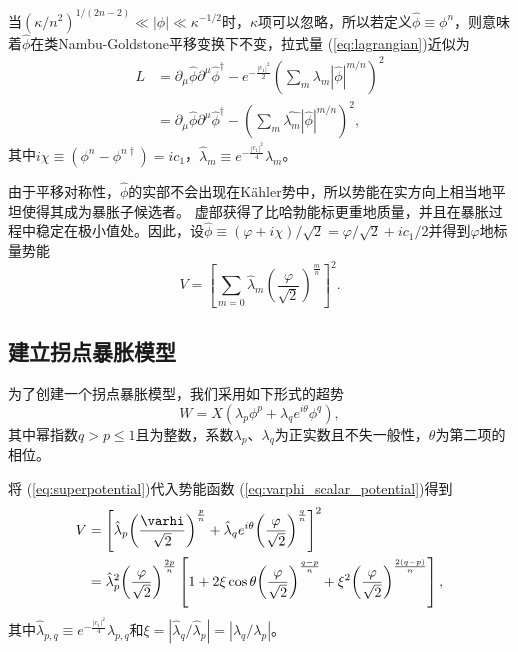 当${(\kappa/n^2)}^{1/(2n-2)}\ll |\phi| \ll
\kappa^{-1/2}$时，$\kappa$项可以忽略，所以若定义$\hat{\phi} \equiv
\phi^n$，则意味着$\hat{\phi}$在类Nambu-Goldstone平移变换下不变，拉式量
(\ref{eq:lagrangian})近似为
\begin{equation}
\begin{split}
    L &= \partial_\mu \hat{\phi}\partial^\mu \hat{\phi}^\dagger -
    e^{-\frac{|c_1|^2}{2}}{(\sum_m \lambda_m|\hat{\phi}|^{m/n})}^2 \\
    &= \partial_\mu \hat{\phi} \partial^\mu \hat{\phi}^\dagger - 
    {(\sum_m \hat{\lambda_m}|\hat{\phi}|^{m/n})}^2,
\end{split}
\end{equation}
其中$i\chi \equiv (\phi^n - \phi^{n\dagger})=i c_1$，$\hat{\lambda}_m\equiv
e^{-\frac{|c_1|^2}{4}}\lambda_m$。

由于平移对称性，$\hat{\phi}$的实部不会出现在K\"ahler势中，所以势能在实方向上相当地平坦使得其成为暴胀子候选者。
虚部获得了比哈勃能标更重地质量，并且在暴胀过程中稳定在极小值处。因此，设$\hat{\phi}\equiv
(\varphi+i \chi)/\sqrt{2}=\varphi/\sqrt{2}+i
c_1/2$并得到$\varphi$地标量势能
\begin{equation}\label{eq:varphi_scalar_potential}
    V = {\left[\sum_{m=0}\hat{\lambda}_m
    {\left(\frac{\varphi}{\sqrt{2}}\right)}^{\frac{m}{n}}\right]}^2.
\end{equation}

\subsection{建立拐点暴胀模型}
为了创建一个拐点暴胀模型，我们采用如下形式的超势
\begin{equation}\label{eq:superpotential}
    W = X(\lambda_p\phi^p + \lambda_q e^{i\theta}\phi^q),
\end{equation}
其中幂指数$q > p \le
1$且为整数，系数$\lambda_p$、$\lambda_q$为正实数且不失一般性，$\theta$为第二项的相位。

将 (\ref{eq:superpotential})代入势能函数
(\ref{eq:varphi_scalar_potential})得到
\begin{equation}
\begin{split}
    V &= {\left[ \hat{\lambda}_p {\left(\frac{\varhi}{\sqrt{2}}\right)}^{\frac{p}{n}}
    + \hat{\lambda}_q e^{i\theta}{\left(\frac{\varphi}{\sqrt{2}}\right)}^{\frac{q}{n}}\right]}^2 \\
    &= \hat{\lambda}_p^2 {\left(\frac{\varphi}{\sqrt{2}}\right)}^{\frac{2p}{n}}
    \left[1 + 2\xi\cos\theta {\left(\frac{\varphi}{\sqrt{2}}\right)}^{\frac{q-p}{n}}
    + \xi^2 {\left(\frac{\varphi}{\sqrt{2}}\right)}^{\frac{2(q-p)}{n}}\right],
\end{split}
\end{equation}
其中$\hat{\lambda}_{p,q}\equiv
e^{-\frac{|c_1|^2}{4}}\lambda_{p,q}$和$\xi=|\hat{\lambda}_q/\hat{\lambda}_p|=|\lambda_q/\lambda_p|$。

